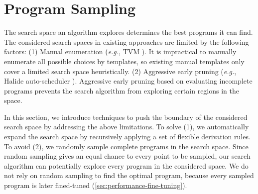 \section{Program Sampling}
\label{sec:program-sampling}
The search space an algorithm explores determines the best programs it can find.
The considered search spaces in existing approaches are limited by the following factors: (1) Manual enumeration (\textit{e.g.}, TVM \cite{chen2018learning}). It is impractical to manually enumerate all possible choices by templates, so existing manual templates only cover a limited search space heuristically. (2) Aggressive early pruning (\textit{e.g.}, Halide auto-scheduler \cite{adams2019learning}). Aggressive early pruning based on evaluating incomplete programs prevents the search algorithm from exploring certain regions in the space.

In this section, we introduce techniques to push the boundary of the considered search space by addressing the above limitations. To solve (1), we automatically expand the search space by recursively applying a set of flexible derivation rules. To avoid (2), we randomly sample complete programs in the search space.
Since random sampling gives an equal chance to every point to be sampled, our search algorithm can potentially explore every program in the considered space.
We do not rely on random sampling to find the optimal program, because every sampled program is later fined-tuned (\autoref{sec:performance-fine-tuning}).



